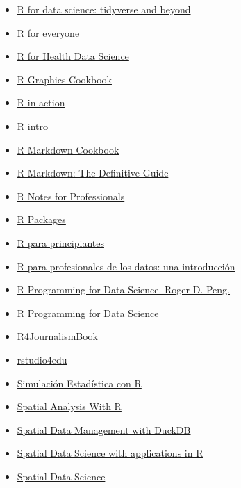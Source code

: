 \documentclass[
  letterpaper,
  DIV=11,
  numbers=noendperiod]{scrartcl}
\begin{document}
\begin{itemize}
{  Analysis}
\item
  \href{https://bookdown.org/Maxine/r4ds/}{R for data science: tidyverse
  and beyond}
\item
  \href{https://www.jaredlander.com/r-for-everyone/}{R for everyone}
\item
  \href{https://argoshare.is.ed.ac.uk/healthyr_book/}{R for Health Data
  Science}
\item
  \href{https://r-graphics.org/index.html}{R Graphics Cookbook}
\item
  \href{https://www.manning.com/books/r-in-action-second-edition}{R in
  action}
\item
  \href{https://cran.r-project.org/doc/manuals/R-intro.pdf}{R intro}
\item
  \href{https://bookdown.org/yihui/rmarkdown-cookbook/}{R Markdown
  Cookbook}
\item
  \href{https://bookdown.org/yihui/rmarkdown/}{R Markdown: The
  Definitive Guide}
\item
  \href{https://books.goalkicker.com/RBook/}{R Notes for Professionals}
\item
  \href{https://r-pkgs.org/}{R Packages}
\item
  \href{https://cran.r-project.org/doc/contrib/rdebuts_es.pdf}{R para
  principiantes}
\item
  \href{https://datanalytics.com/libro_r/}{R para profesionales de los
  datos: una introducción}
\item
  \href{https://leanpub.com/rprogramming}{R Programming for Data
  Science. Roger D. Peng.}
\item
  \href{https://www.cs.upc.edu/~robert/teaching/estadistica/rprogramming.pdf}{R
  Programming for Data Science}
\item
  \href{https://smach.github.io/R4JournalismBook/}{R4JournalismBook}
\item
  \href{https://rstudio4edu.github.io/rstudio4edu-book/}{rstudio4edu}
\item
  \href{https://rubenfcasal.github.io/simbook/}{Simulación Estadística
  con R}
\item
  \href{http://gis.humboldt.edu/OLM/r/Spatial\%20Analysis\%20With\%20R.pdf}{Spatial
  Analysis With R}
\item
  \href{https://duckdb.gishub.org/}{Spatial Data Management with DuckDB}
\item
  \href{https://r-spatial.org/book/}{Spatial Data Science with
  applications in R}
\item
  \href{https://keen-swartz-3146c4.netlify.app/}{Spatial Data Science}

\end{itemize}
\end{document}
